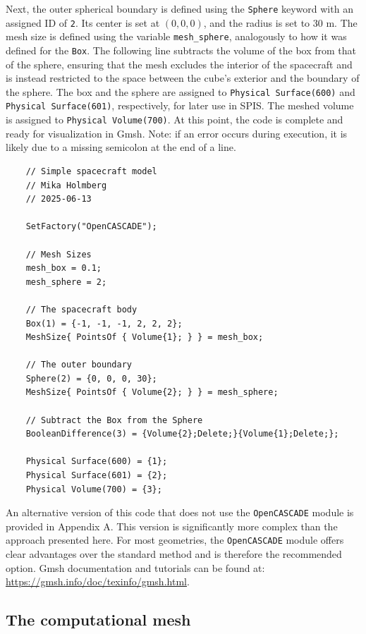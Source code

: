 \documentclass[a4paper, 12pt]{article}
\begin{document}
Next, the outer spherical boundary is defined using the \verb|Sphere| keyword with an assigned ID of \verb|2|. Its center is set at $(0, 0, 0)$, and the radius is set to 30 m. The mesh size is defined using the variable \verb|mesh_sphere|, analogously to how it was defined for the \verb|Box|. The following line subtracts the volume of the box from that of the sphere, ensuring that the mesh excludes the interior of the spacecraft and is instead restricted to the space between the cube’s exterior and the boundary of the sphere. The box and the sphere are assigned to \verb|Physical Surface(600)| and \verb|Physical Surface(601)|, respectively, for later use in SPIS. The meshed volume is assigned to \verb|Physical Volume(700)|. At this point, the code is complete and ready for visualization in Gmsh. Note: if an error occurs during execution, it is likely due to a missing semicolon at the end of a line.

\begin{verbatim}
    // Simple spacecraft model 
    // Mika Holmberg 
    // 2025-06-13

    SetFactory("OpenCASCADE");

    // Mesh Sizes
    mesh_box = 0.1;
    mesh_sphere = 2;

    // The spacecraft body 
    Box(1) = {-1, -1, -1, 2, 2, 2};
    MeshSize{ PointsOf { Volume{1}; } } = mesh_box;

    // The outer boundary
    Sphere(2) = {0, 0, 0, 30};
    MeshSize{ PointsOf { Volume{2}; } } = mesh_sphere;

    // Subtract the Box from the Sphere
    BooleanDifference(3) = {Volume{2};Delete;}{Volume{1};Delete;};

    Physical Surface(600) = {1};
    Physical Surface(601) = {2};
    Physical Volume(700) = {3};
\end{verbatim}

An alternative version of this code that does not use the \verb|OpenCASCADE| module is provided in Appendix A. This version is significantly more complex than the approach presented here. For most geometries, the \verb|OpenCASCADE| module offers clear advantages over the standard method and is therefore the recommended option. Gmsh documentation and tutorials can be found at: \url{https://gmsh.info/doc/texinfo/gmsh.html}.\par

\subsection{The computational mesh}
\vspace{2mm}
\end{document}
